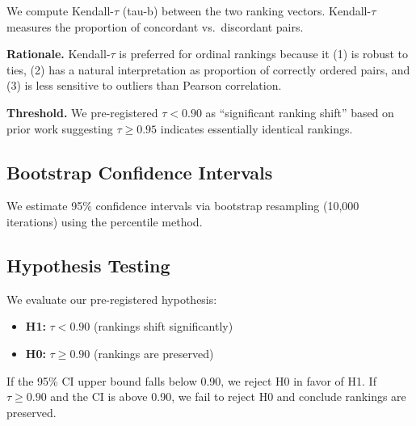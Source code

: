 We compute Kendall-$\tau$ (tau-b) between the two ranking vectors. Kendall-$\tau$ measures the proportion of concordant vs.\ discordant pairs.

\textbf{Rationale.} Kendall-$\tau$ is preferred for ordinal rankings because it (1) is robust to ties, (2) has a natural interpretation as proportion of correctly ordered pairs, and (3) is less sensitive to outliers than Pearson correlation.

\textbf{Threshold.} We pre-registered $\tau < 0.90$ as ``significant ranking shift'' based on prior work suggesting $\tau \geq 0.95$ indicates essentially identical rankings.

\subsection{Bootstrap Confidence Intervals}

We estimate 95\% confidence intervals via bootstrap resampling (10,000 iterations) using the percentile method.

\subsection{Hypothesis Testing}

We evaluate our pre-registered hypothesis:

\begin{itemize}
    \item \textbf{H1:} $\tau < 0.90$ (rankings shift significantly)
    \item \textbf{H0:} $\tau \geq 0.90$ (rankings are preserved)
\end{itemize}

If the 95\% CI upper bound falls below 0.90, we reject H0 in favor of H1. If $\tau \geq 0.90$ and the CI is above 0.90, we fail to reject H0 and conclude rankings are preserved.
